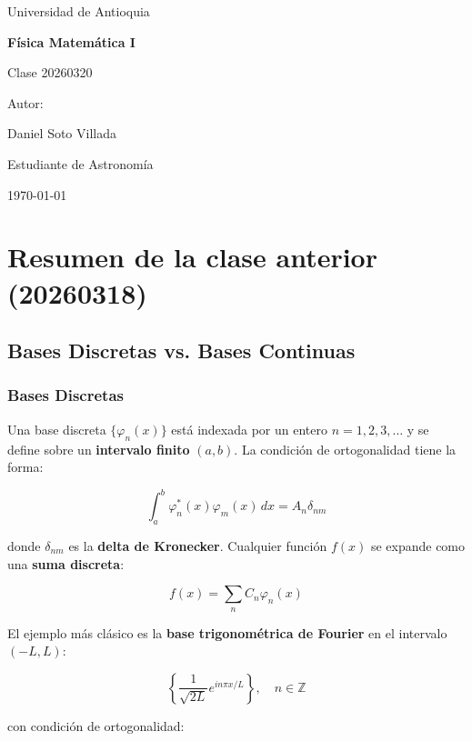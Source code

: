 \documentclass[a4paper]{article}
\begin{document}
\begin{titlepage}
  \centering
  {\Large Universidad de Antioquia\par}
  \vspace{2cm}
  {\huge\bfseries Física Matemática I\par}
  \vspace{0.4cm}
  {\Large Clase 20260320\par}
  \vspace{2.5cm}
  {\large Autor:\par}
  \vspace{0.2cm}
  {\large Daniel Soto Villada\par}
  {\large Estudiante de Astronomía\par}
  \vfill
  {\large \today\par}
\end{titlepage}

\newpage
\tableofcontents
\newpage

\section{Resumen de la clase anterior (20260318)}

\subsection{Bases Discretas vs. Bases Continuas}

\subsubsection{Bases Discretas}

Una base discreta $\{\varphi_n(x)\}$ está indexada por un entero $n = 1, 2, 3, \ldots$ y se define sobre un \textbf{intervalo finito} $(a, b)$. La condición de ortogonalidad tiene la forma:

$$\int_a^b \varphi_n^*(x)\varphi_m(x)\, dx = A_n \delta_{nm}$$

donde $\delta_{nm}$ es la \textbf{delta de Kronecker}. Cualquier función $f(x)$ se expande como una \textbf{suma discreta}:

$$f(x) = \sum_n C_n \varphi_n(x)$$

El ejemplo más clásico es la \textbf{base trigonométrica de Fourier} en el intervalo $(-L, L)$:

$$\left\{\frac{1}{\sqrt{2L}}e^{in\pi x/L}\right\}, \quad n \in \mathbb{Z}$$

con condición de ortogonalidad:
\end{document}
